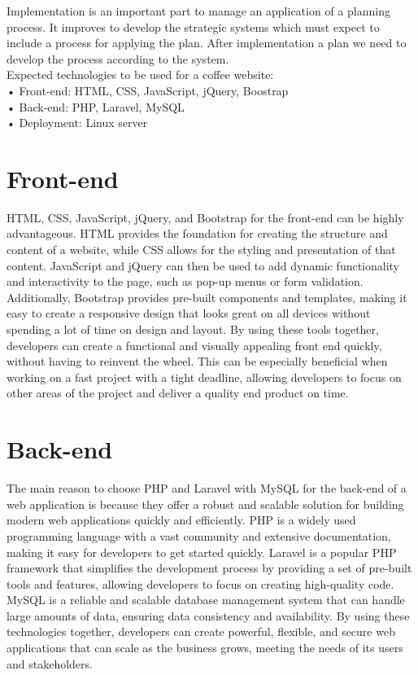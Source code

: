 Implementation is an important part to manage an application of a planning process. It improves to develop the strategic systems which must expect to include a process for applying the plan. After implementation a plan we need to develop the process according to the system.\\
Expected technologies to be used for a coffee website:\\
• Front-end: HTML, CSS, JavaScript, jQuery, Boostrap \\
• Back-end: PHP, Laravel, MySQL \\
• Deployment: Linux server
\section{Front-end}
HTML, CSS, JavaScript, jQuery, and Bootstrap for the front-end can be highly advantageous. HTML provides the foundation for creating the structure and content of a website, while CSS allows for the styling and presentation of that content. JavaScript and jQuery can then be used to add dynamic functionality and interactivity to the page, such as pop-up menus or form validation. Additionally, Bootstrap provides pre-built components and templates, making it easy to create a responsive design that looks great on all devices without spending a lot of time on design and layout. By using these tools together, developers can create a functional and visually appealing front end quickly, without having to reinvent the wheel. This can be especially beneficial when working on a fast project with a tight deadline, allowing developers to focus on other areas of the project and deliver a quality end product on time.
\section{Back-end}
The main reason to choose PHP and Laravel with MySQL for the back-end of a web application is because they offer a robust and scalable solution for building modern web applications quickly and efficiently. PHP is a widely used programming language with a vast community and extensive documentation, making it easy for developers to get started quickly. Laravel is a popular PHP framework that simplifies the development process by providing a set of pre-built tools and features, allowing developers to focus on creating high-quality code. MySQL is a reliable and scalable database management system that can handle large amounts of data, ensuring data consistency and availability. By using these technologies together, developers can create powerful, flexible, and secure web applications that can scale as the business grows, meeting the needs of its users and stakeholders.
